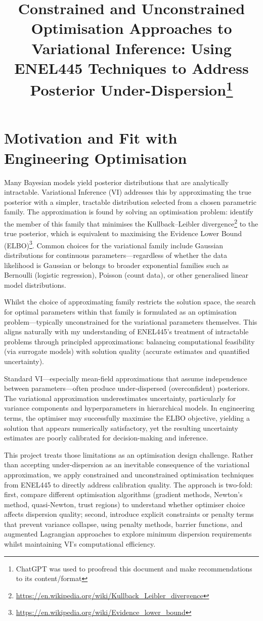 \documentclass[11pt,a4paper]{article}
\title{Constrained and Unconstrained Optimisation Approaches to Variational Inference: Using ENEL445 Techniques to Address Posterior Under-Dispersion\footnote{ChatGPT was used to proofread this document and make recommendations to its content/format}}
\author{}
\date{}
\begin{document}
\maketitle

\section{Motivation and Fit with Engineering Optimisation}

Many Bayesian models yield posterior distributions that are analytically intractable. Variational Inference (VI) addresses this by approximating the true posterior with a simpler, tractable distribution selected from a chosen parametric family. The approximation is found by solving an optimisation problem: identify the member of this family that minimises the Kullback–Leibler divergence\footnote{\url{https://en.wikipedia.org/wiki/Kullback_Leibler_divergence}} to the true posterior, which is equivalent to maximising the Evidence Lower Bound (ELBO)\footnote{\url{https://en.wikipedia.org/wiki/Evidence_lower_bound}}. Common choices for the variational family include Gaussian distributions for continuous parameters—regardless of whether the data likelihood is Gaussian or belongs to broader exponential families such as Bernoulli (logistic regression), Poisson (count data), or other generalised linear model distributions.

Whilst the choice of approximating family restricts the solution space, the search for optimal parameters within that family is formulated as an optimisation problem—typically unconstrained for the variational parameters themselves.  This aligns naturally with my understanding of ENEL445's treatment of intractable problems through principled approximations: balancing computational feasibility (via surrogate models) with solution quality (accurate estimates and quantified uncertainty).

Standard VI—especially mean-field approximations that assume independence between parameters—often produce under-dispersed (overconfident) posteriors. The variational approximation underestimates uncertainty, particularly for variance components and hyperparameters in hierarchical models. In engineering terms, the optimiser may successfully maximise the ELBO objective, yielding a solution that appears numerically satisfactory, yet the resulting uncertainty estimates are poorly calibrated for decision-making and inference.

This project treats those limitations as an optimisation design challenge. Rather than accepting under-dispersion as an inevitable consequence of the variational approximation, we apply constrained and unconstrained optimisation techniques from ENEL445 to directly address calibration quality. The approach is two-fold: first, compare different optimisation algorithms (gradient methods, Newton's method, quasi-Newton, trust regions) to understand whether optimiser choice affects dispersion quality; second, introduce explicit constraints or penalty terms that prevent variance collapse, using penalty methods, barrier functions, and augmented Lagrangian approaches to explore minimum dispersion requirements whilst maintaining VI's computational efficiency.
\end{document}
